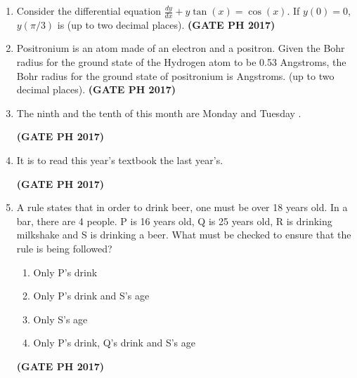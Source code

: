 \documentclass[14pt, a4paper]{extarticle}
\begin{document}
\begin{enumerate}[label=\textbf{Q.\arabic*}]
\item Consider the differential equation $\frac{dy}{dx} + y \tan(x) = \cos(x)$. If $y(0)=0$, $y(\pi/3)$ is \underline{\hspace{3cm}} (up to two decimal places).
\hfill \textbf{(GATE PH 2017)}

\item Positronium is an atom made of an electron and a positron. Given the Bohr radius for the ground state of the Hydrogen atom to be 0.53 Angstroms, the Bohr radius for the ground state of positronium is \underline{\hspace{3cm}} Angstroms. (up to two decimal places).
\hfill \textbf{(GATE PH 2017)}

\item The ninth and the tenth of this month are Monday and Tuesday \underline{\hspace{3cm}}.
\begin{enumerate}
\end{enumerate}
\hfill \textbf{(GATE PH 2017)}

\item It is \underline{\hspace{2cm}} to read this year's textbook \underline{\hspace{2cm}} the last year's.
\begin{enumerate}
\end{enumerate}
\hfill \textbf{(GATE PH 2017)}

\item A rule states that in order to drink beer, one must be over 18 years old. In a bar, there are 4 people. P is 16 years old, Q is 25 years old, R is drinking milkshake and S is drinking a beer. What must be checked to ensure that the rule is being followed?
\begin{enumerate}
\item Only P's drink
\item Only P's drink and S's age
\item Only S's age
\item Only P's drink, Q's drink and S's age
\end{enumerate}
\hfill \textbf{(GATE PH 2017)}


\end{enumerate}
\end{document}

